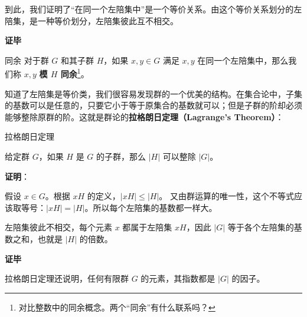 到此，我们证明了“在同一个左陪集中”是一个等价关系。由这个等价关系划分的左陪集，是一种等价划分，左陪集彼此互不相交。

\textbf{证毕}

\begin{definition}{同余}
对于群 $G$ 和其子群 $H$，如果 $x, y\in G$ 满足 $x, y$ 在同一个左陪集中，那么我们称 $x, y$ \textbf{模 $H$ 同余}\footnote{对比整数中的同余概念。两个“同余”有什么联系吗？}。
\end{definition}

知道了左陪集是等价类，我们很容易发现群的一个优美的结构。在集合论中，子集的基数可以是任意的，只要它小于等于原集合的基数就可以；但是子群的阶却必须能够整除原群的阶。这就是群论的\textbf{拉格朗日定理（Lagrange's Theorem）}：

\begin{theorem}{拉格朗日定理}\label{the_coset_2}

给定群 $G$，如果 $H$ 是 $G$ 的子群，那么 $|H|$ 可以整除 $|G|$。

\end{theorem}

\textbf{证明}：

假设 $x\in G$。根据 $xH$ 的定义，$|xH|\leq|H|$。 又由群运算的唯一性，这个不等式应该取等号：$|xH|=|H|$。所以每个左陪集的基数都一样大。

左陪集彼此不相交，每个元素 $x$ 都属于左陪集 $xH$，因此 $|G|$ 等于各个左陪集的基数之和，也就是 $|H|$ 的倍数。

\textbf{证毕}

拉格朗日定理还说明，任何有限群 $G$ 的元素，其指数都是 $|G|$ 的因子。

